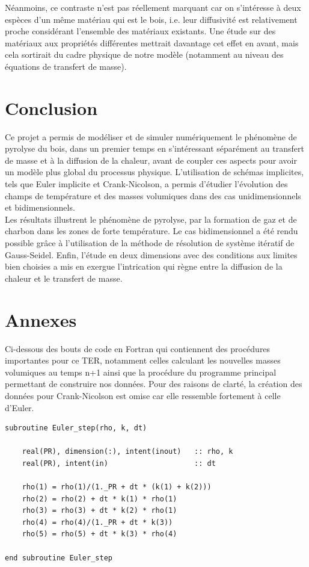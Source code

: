 \documentclass[a4paper,11pt]{article}
\begin{document}
Néanmoins, ce contraste n'est pas réellement marquant car on s'intéresse à deux espèces d'un même matériau qui est le bois, i.e. leur diffusivité est relativement proche considérant l'ensemble des matériaux existants. Une étude sur des matériaux aux propriétés différentes mettrait davantage cet effet en avant, mais cela sortirait du cadre physique de notre modèle (notamment au niveau des équations de transfert de masse).
\section{Conclusion}


Ce projet a permis de modéliser et de simuler numériquement le phénomène de pyrolyse du bois, dans un premier temps en s'intéressant séparément au transfert de masse et à la diffusion de la chaleur, avant de coupler ces aspects pour avoir un modèle plus global du processus physique. L'utilisation de schémas implicites, tels que Euler implicite et Crank-Nicolson, a permis d'étudier l'évolution des champs de température et des masses volumiques dans des cas unidimensionnels et bidimensionnels. \\

Les résultats illustrent le phénomène de pyrolyse, par la formation de gaz et de charbon dans les zones de forte température. Le cas bidimensionnel a été rendu possible grâce à l'utilisation de la méthode de résolution de système itératif de Gauss-Seidel. Enfin, l'étude en deux dimensions avec des conditions aux limites bien choisies a mis en exergue l'intrication qui règne entre la diffusion de la chaleur et le transfert de masse.

\newpage
\section{Annexes}
Ci-dessous des bouts de code en Fortran qui contiennent des procédures importantes pour ce TER, notamment celles calculant les nouvelles masses volumiques au temps n+1 ainsi que la procédure du programme principal permettant de construire nos données. Pour des raisons de clarté, la création des données pour Crank-Nicolson est omise car elle ressemble fortement à celle d'Euler.

\vspace{0.5cm}
\begin{lstlisting}[caption={Procédure \texttt{Euler\_step}}, label={lst:euler_step}]
subroutine Euler_step(rho, k, dt)

    real(PR), dimension(:), intent(inout)   :: rho, k
    real(PR), intent(in)                    :: dt

    rho(1) = rho(1)/(1._PR + dt * (k(1) + k(2)))
    rho(2) = rho(2) + dt * k(1) * rho(1)
    rho(3) = rho(3) + dt * k(2) * rho(1)
    rho(4) = rho(4)/(1._PR + dt * k(3))
    rho(5) = rho(5) + dt * k(3) * rho(4)

end subroutine Euler_step
\end{lstlisting}
\end{document}
